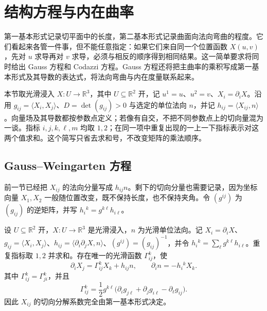 
% 
% 

\section{结构方程与内在曲率}
\label{g1:sec:0803}

第一基本形式记录切平面中的长度，第二基本形式记录曲面向法向弯曲的程度。它们看起来各管一件事，但不能任意指定：如果它们来自同一个位置函数 \(X(u,v)\)，先对 \(u\) 求导再对 \(v\) 求导，必须与相反的顺序得到相同结果。这一简单要求将同时给出 Gauss 方程和 Codazzi 方程。Gauss 方程还将把主曲率的乘积写成第一基本形式及其导数的表达式，将法向弯曲与内在度量联系起来。

\ProseParagraphBreak

本节取光滑浸入 \(X\colon U\rightarrow\mathbb R^3\)，其中 \(U\subseteq\mathbb R^2\) 开，记 \(u^1=u\)、\(u^2=v\)、\(X_i=\partial_iX\)。沿用 \(g_{ij}=\langle X_i,X_j\rangle\)、\(D=\det(g_{ij})>0\) 与选定的单位法向 \(n\)，并记 \(h_{ij}=\langle X_{ij},n\rangle\)。向量场及其导数都按参数点定义；若像有自交，不把不同参数点上的切向量混为一谈。指标 \(i,j,k,\ell,m\) 均取 \(1,2\)；在同一项中重复出现的一上一下指标表示对这两个值求和。这个简写只省去求和号，不改变矩阵的乘法顺序。

\subsection{Gauss–Weingarten 方程}
\label{g1:subsec:0803:01}

前一节已经把 \(X_{ij}\) 的法向分量写成 \(h_{ij}n\)。剩下的切向分量也需要记录，因为坐标向量 \(X_1,X_2\) 一般随位置改变，既不保持长度，也不保持夹角。令 \((g^{ij})\) 为 \((g_{ij})\) 的逆矩阵，并写 \(h_i{}^k=g^{k\ell}h_{i\ell}\)。

\begin{proposition}
	\label{g1:prop:gauss-weingarten}
	设 \(U\subseteq\mathbb R^2\) 开，\(X:U\rightarrow\mathbb R^3\) 是光滑浸入，\(n\) 为光滑单位法向。记 \(X_i=\partial_iX\)、\(g_{ij}=\langle X_i,X_j\rangle\)、\(h_{ij}=\langle\partial_i\partial_jX,n\rangle\)、\((g^{ij})=(g_{ij})^{-1}\)，并令 \(h_i{}^k=\sum_\ell g^{k\ell}h_{i\ell}\)。重复指标取 \(1,2\) 并求和。存在唯一的光滑函数 \(\Gamma^k_{ij}\)，使
	\begin{equation}
		\label{g1:eq:gauss-weingarten}
		\partial_iX_j=\Gamma^k_{ij}X_k+h_{ij}n,\qquad
		\partial_i n=-h_i{}^kX_k.
	\end{equation}
	其中 \(\Gamma^k_{ij}=\Gamma^k_{ji}\)，并且
	\begin{equation}
		\label{g1:eq:christoffel-metric}
		\Gamma^k_{ij}
		=\frac12g^{k\ell}\bigl(\partial_i g_{j\ell}+\partial_j g_{i\ell}-\partial_\ell g_{ij}\bigr).
	\end{equation}
	因此 \(X_{ij}\) 的切向分解系数完全由第一基本形式决定。
\end{proposition}

